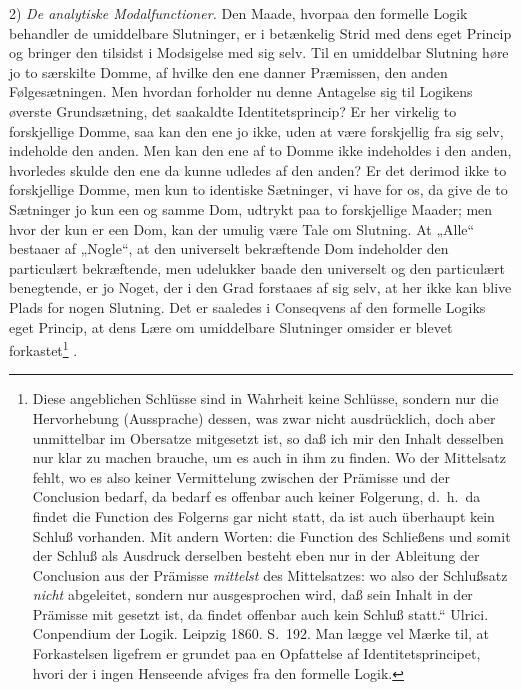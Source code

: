 \documentclass[12pt]{book}
\begin{document}
2) \emph{De analytiske Modalfunctioner.} Den Maade, hvorpaa den formelle Logik behandler de umiddelbare Slutninger, er i betænkelig Strid med dens eget Princip og bringer den tilsidst i Modsigelse med sig selv. Til en umiddelbar Slutning høre jo to særskilte Domme, af hvilke den ene danner Præmissen, den anden Følgesætningen. Men hvordan forholder nu denne Antagelse sig til Logikens øverste Grundsætning, det saakaldte Identitetsprincip? Er her virkelig to forskjellige Domme, saa kan den ene jo ikke, uden at være forskjellig fra sig selv, indeholde den anden. Men kan den ene af to Domme ikke indeholdes i den anden, hvorledes skulde den ene da kunne udledes af den anden? Er det derimod ikke to forskjellige Domme, men kun to identiske Sætninger, vi have for os, da give de to Sætninger jo kun een og samme Dom, udtrykt paa to forskjellige Maader; men hvor der kun er een Dom, kan der umulig være Tale om Slutning. At „Alle“ bestaaer af „Nogle“, at den universelt bekræftende Dom indeholder den particulært bekræftende, men udelukker baade den universelt og den particulært benegtende, er jo Noget, der i den Grad forstaaes af sig selv, at her ikke kan blive Plads for nogen Slutning. Det er saaledes i Conseqvens af den formelle Logiks eget Princip, at dens Lære om umiddelbare Slutninger omsider er blevet forkastet\footnote{Diese angeblichen Schlüsse sind in Wahrheit keine Schlüsse, sondern nur die Hervorhebung (Aussprache) dessen, was zwar nicht ausdrücklich, doch aber unmittelbar im Obersatze mitgesetzt ist, so daß %
ich mir den Inhalt desselben nur klar zu machen brauche, um es auch in ihm zu finden. Wo der Mittelsatz fehlt, wo es also keiner Vermittelung zwischen der Prämisse und der Conclusion bedarf, da bedarf es offenbar auch keiner Folgerung, d.\ h.\ da findet die Function des Folgerns gar nicht statt, da ist auch überhaupt kein Schluß vorhanden. Mit andern Worten: die Function des Schließens und somit der Schluß als Ausdruck derselben besteht eben nur in der Ableitung der Conclusion aus der Prämisse \emph{mittelst} des Mittelsatzes: wo also der Schlußsatz \emph{nicht} abgeleitet, sondern nur ausgesprochen wird, daß sein Inhalt in der Prämisse mit gesetzt ist, da findet offenbar auch kein Schluß statt.“ Ulrici. Conpendium der Logik. Leipzig 1860. S.~192. Man lægge vel Mærke til, at Forkastelsen ligefrem er grundet paa en Opfattelse af Identitetsprincipet, hvori der i ingen Henseende afviges fra den formelle Logik.}%
.
\end{document}
